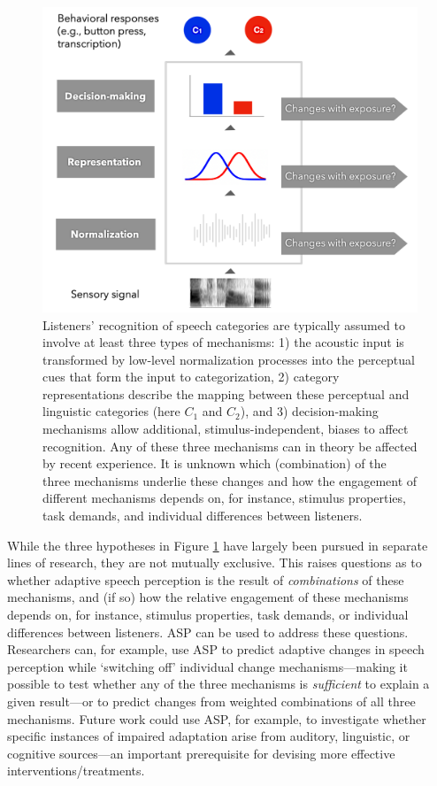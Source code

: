 \documentclass[
  11pt,
  man,floatsintext]{apa6}
\begin{document}
\begin{figure}[h]
\begin{center}
\includegraphics[width=0.6\columnwidth]{../figures/diagrams/overview-of-three-mechanisms.png}
\caption{Listeners' recognition of speech categories are typically assumed to involve at least three types of mechanisms: 1) the acoustic input is transformed by low-level normalization processes into the perceptual cues that form the input to categorization, 2) category representations describe the mapping between these perceptual and linguistic categories (here $C_1$ and $C_2$), and 3) decision-making mechanisms allow additional, stimulus-independent, biases to affect recognition. Any of these three mechanisms can in theory be affected by recent experience. It is unknown which (combination) of the three mechanisms underlie these changes and how the engagement of different mechanisms depends on, for instance, stimulus properties, task demands, and individual differences between listeners.}\label{fig:overview}
\end{center}
\end{figure}

While the three hypotheses in Figure \ref{fig:overview} have largely been pursued in separate lines of research, they are not mutually exclusive. This raises questions as to whether adaptive speech perception is the result of \emph{combinations} of these mechanisms, and (if so) how the relative engagement of these mechanisms depends on, for instance, stimulus properties, task demands, or individual differences between listeners. ASP can be used to address these questions. Researchers can, for example, use ASP to predict adaptive changes in speech perception while `switching off' individual change mechanisms---making it possible to test whether any of the three mechanisms is \emph{sufficient} to explain a given result---or to predict changes from weighted combinations of all three mechanisms. Future work could use ASP, for example, to investigate whether specific instances of impaired adaptation \autocites[as seen, e.g., in children with dyslexia,][]{gabay2021,ozernov-palchik2021} arise from auditory, linguistic, or cognitive sources---an important prerequisite for devising more effective interventions/treatments.
\end{document}
